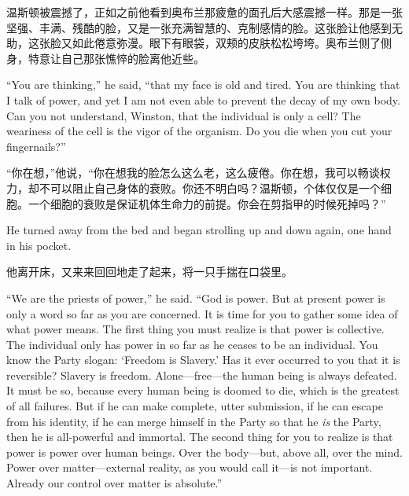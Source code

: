 \begin{paracol}{2}
\switchcolumn

温斯顿被震撼了，正如之前他看到奥布兰那疲惫的面孔后大感震撼一样。那是一张坚强、丰满、残酷的脸，又是一张充满智慧的、克制感情的脸。这张脸让他感到无助，这张脸又如此倦意弥漫。眼下有眼袋，双颊的皮肤松松垮垮。奥布兰侧了侧身，特意让自己那张憔悴的脸离他近些。

\switchcolumn*

``You are thinking,'' he said, ``that my face is old and tired. You are
thinking that I talk of power, and yet I am not even able to prevent the
decay of my own body. Can you not understand, Winston, that the
individual is only a cell? The weariness of the cell is the vigor of the
organism. Do you die when you cut your fingernails?''

\switchcolumn

``你在想，''他说，``你在想我的脸怎么这么老，这么疲倦。你在想，我可以畅谈权力，却不可以阻止自己身体的衰败。你还不明白吗？温斯顿，个体仅仅是一个细胞。一个细胞的衰败是保证机体生命力的前提。你会在剪指甲的时候死掉吗？''

\switchcolumn*

He turned away from the bed and began strolling up and down again, one
hand in his pocket.

\switchcolumn

他离开床，又来来回回地走了起来，将一只手揣在口袋里。

\switchcolumn*

``We are the priests of power,'' he said. ``God is power. But at present
power is only a word so far as you are concerned. It is time for you to
gather some idea of what power means. The first thing you must realize
is that power is collective. The individual only has power in so far as
he ceases to be an individual. You know the Party slogan:
`Freedom is Slavery.' Has it ever
occurred to you that it is reversible? Slavery is freedom.
Alone---free---the human being is always defeated. It must be so,
because every human being is doomed to die, which is the greatest of all
failures. But if he can make complete, utter submission, if he can
escape from his identity, if he can merge himself in the Party so that
he \emph{is} the Party, then he is all-powerful and immortal. The second
thing for you to realize is that power is power over human beings. Over
the body---but, above all, over the mind. Power over matter---external
reality, as you would call it---is not important. Already our control
over matter is absolute.''

\switchcolumn


\end{paracol}
